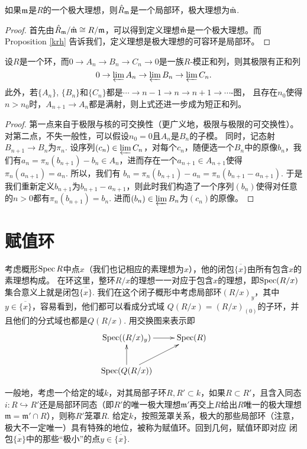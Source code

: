 \begin{pro}
如果$\mathfrak{m}$是$R$的一个极大理想，则$\hat R_{\mathfrak{m}}$是一个局部环，极大理想为$\hat{\mathfrak{m}}$.
\end{pro}

\begin{proof}
	首先由$\hat R_{\mathfrak{m}}/\hat{\mathfrak{m}}\cong R/\mathfrak{m}$，可以得到定义理想$\hat {\mathfrak{m}}$是一个极大理想。而Proposition \ref{krh} 告诉我们，定义理想是极大理想的可容环是局部环。
\end{proof}

\begin{pro}
	设$R$是一个环，而$0\to A_n \to B_n \to C_n \to 0$是一族$R$-模正和列，则其极限有正和列
	\[
		0\to \varprojlim A_n\to \varprojlim B_n\to \varprojlim C_n.
	\]
	此外，若$\{A_n\}$, $\{B_n\}$和$\{C_n\}$都是$\cdots \to n-1 \to  n\to n+1\to \cdots$-图，
	且存在$n_0$使得$n>n_0$时，$A_{n+1}\to A_n$都是满射，则上式还进一步成为短正和列。
\end{pro}

\begin{proof}
	第一点来自于极限与核的可交换性（更广义地，极限与极限的可交换性）。对第二点，不失一般性，可以假设$n_0=0$且$A_n$是$B_n$的子模。
	同时，记态射$B_{n+1}\to B_n$为$\pi_n$.
	设序列$(c_n)\in \varprojlim C_n$，对每个$c_n$，随便选一个$B_n$中的原像$b_n$，我们有$a_n=\pi_n(b_{n+1})-b_n\in A_n$，进而存在一个$a_{n+1}\in A_{n+1}$使得$\pi_n(a_{n+1})=a_n$. 所以，我们有
	$b_n=\pi_n(b_{n+1})-a_n=\pi_n(b_{n+1}-a_{n+1})$. 于是我们重新定义$b_{n+1}$为$b_{n+1}-a_{n+1}$，则此时我们构造了一个序列$(b_n)$使得对任意的$n>0$都有$\pi_n(b_{n+1})=b_n$. 进而$(b_n)\in \varprojlim B_n$为$(c_n)$的原像。
\end{proof}

\section{赋值环}

考虑概形$\operatorname{Spec} R$中点$x$（我们也记相应的素理想为$x$），他的闭包$\overline{\{x\}}$由所有包含$x$的素理想构成。
在环这里，整环$R/x$的理想一一对应于包含$x$的理想，即$\operatorname{Spec}(R/x)$集合意义上就是闭包$\overline{\{x\}}$.
我们在这个闭子概形中考虑局部环$(R/x)_y$，其中$y\in \overline{\{x\}}$，容易看到，他们都可以看成分式域
$Q(R/x)=(R/x)_{(0)}$的子环，并且他们的分式域也都是$Q(R/x)$. 用交换图来表示即
\[
	\xymatrix{
		\spec((R/x)_y)\ar[r] & \spec(R)\\
		\spec(Q(R/x))\ar[u]\ar[ru]&
	}
\]

一般地，考虑一个给定的域$k$，对其局部子环$R,R'\subset k$，如果$R\subset R'$，且含入同态$i:R\hookrightarrow R'$还是局部环同态（即$R'$的唯一极大理想$\mathfrak m'$再交上$R$给出$R$唯一的极大理想$\mathfrak m=\mathfrak m'\cap R$），则称$R'$笼罩$R$. 给定$k$，按照笼罩关系，极大的那些局部环（注意，极大不一定唯一）具有特殊的地位，被称为赋值环。回到几何，赋值环即对应
闭包$\overline{\{x\}}$中的那些“极小”的点$y\in \overline{\{x\}}$. 

